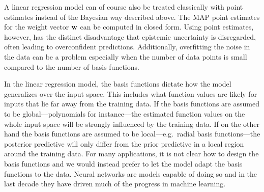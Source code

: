 \documentclass[../thesis.tex]{subfiles}
\begin{document}
A linear regression model can of course also be treated classically with point estimates instead of the Bayesian way described above. The MAP point estimates for the weight vector $\boldsymbol{\mathbf{w}}$ can be computed in closed form. Using point estimates, however, has the distinct disadvantage that epistemic uncertainty is disregarded, often leading to overconfident predictions. Additionally, overfitting the noise in the data can be a problem especially when the number of data points is small compared to the number of basis functions.

In the linear regression model, the basis functions dictate how the model generalizes over the input space. This includes what function values are likely for inputs that lie far away from the training data. If the basis functions are assumed to be global---polynomials for instance---the estimated function values on the whole input space will be strongly influenced by the training data. If on the other hand the basis functions are assumed to be local---e.g.\ radial basis functions---the posterior predictive will only differ from the prior predictive in a local region around the training data. For many applications, it is not clear how to design the basis functions and we would instead prefer to let the model adapt the basis functions to the data. Neural networks are models capable of doing so and in the last decade they have driven much of the progress in machine learning.
\end{document}
